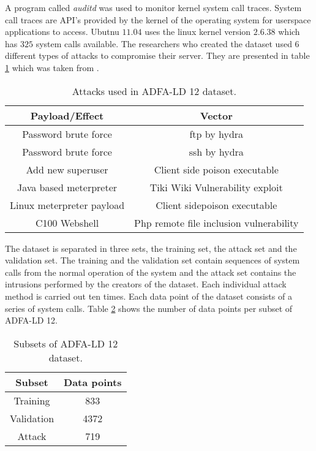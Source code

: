 \documentclass[reqno,openany,12pt]{amsbook}
\begin{document}
A program called \emph{auditd} was used to monitor kernel system call traces. System call traces are API's provided by the kernel of the operating system for userspace applications to access. Ubutnu $11.04$ uses the linux kernel version $2.6.38$ which has $325$ system calls available\cite{adf1}. The researchers who created the dataset used 6 different types of attacks to compromise their server. They are presented in table \ref{tab2} which was taken from \cite{dat2}.
\begin{table}
\begin{tabular}{|c|c|}
\hline
Payload/Effect & Vector \\ \hline 
Password brute force  & ftp by hydra \\ \hline
Password brute force & ssh by hydra \\ \hline
Add new superuser & Client side poison executable\\ \hline
Java based meterpreter & Tiki Wiki Vulnerability exploit\\ \hline
Linux meterpreter payload & Client sidepoison executable\\ \hline
C100 Webshell & Php remote file inclusion vulnerability \\ \hline
\end{tabular}
\vspace{5pt}
\caption{Attacks used in ADFA-LD 12 dataset.}
\label{tab2}
\end{table}
The dataset is separated in three sets, the training set, the attack set and the validation set. The training and the validation set contain sequences of system calls from the normal operation of the system and the attack set contains the intrusions performed by the creators of the dataset. Each individual attack method is carried out ten times. Each data point of the dataset consists of a series of system calls. Table \ref{tab3} shows the number of data points per subset of ADFA-LD 12.
\begin{table}
\begin{tabular}{|c|c|}
\hline
Subset &  Data points \\ \hline 
Training  & 833 \\ \hline
Validation & 4372 \\ \hline
Attack &  719\\ \hline
\end{tabular}
\vspace{5pt}
\caption{Subsets of ADFA-LD 12 dataset.}
\label{tab3}
\end{table}
\end{document}
